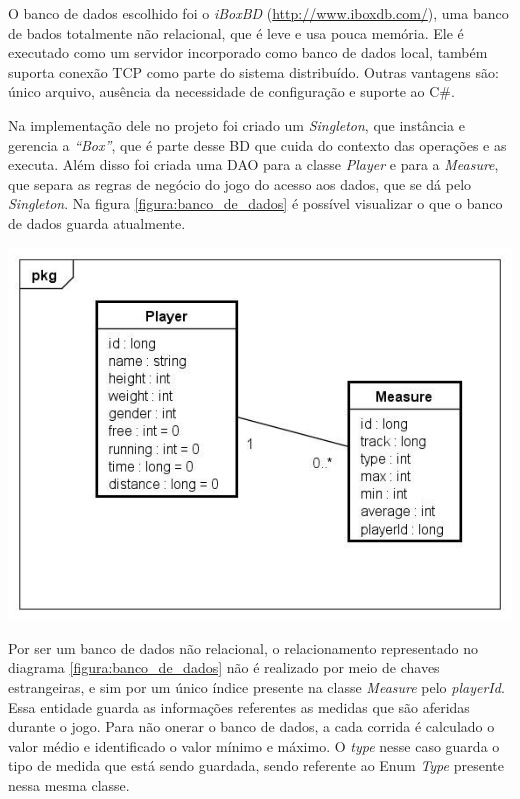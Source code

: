 O banco de dados escolhido foi o \textit{iBoxBD} (\url{http://www.iboxdb.com/}), uma banco de bados totalmente não relacional, que é leve e usa pouca memória. Ele é executado como um servidor incorporado como banco de dados local, também suporta conexão TCP como parte do sistema distribuído. Outras vantagens são: único arquivo, ausência da necessidade de configuração e suporte ao C\#.

Na implementação dele no projeto foi criado um \textit{Singleton}, que instância e gerencia a \textit{“Box”}, que é parte desse BD que cuida do contexto das operações e as executa. Além disso foi criada uma DAO para a classe \textit{Player} e para a \textit{Measure}, que separa as regras de negócio do jogo do acesso aos dados, que se dá pelo \textit{Singleton}. Na figura \ref{figura:banco_de_dados} é possível visualizar o que o banco de dados guarda atualmente.

\begin{center}
	\includegraphics[scale=0.6]{figuras/banco_de_dados}
	\label{figura:banco_de_dados}
\end{center}

Por ser um banco de dados não relacional, o relacionamento representado no diagrama \ref{figura:banco_de_dados} não é realizado por meio de chaves estrangeiras, e sim por um único índice presente na classe \textit{Measure} pelo \textit{playerId}. Essa entidade guarda as informações referentes as medidas que são aferidas durante o jogo. Para não onerar o banco de dados, a cada corrida é calculado o valor médio e identificado o valor mínimo e máximo. O \textit{type} nesse caso guarda o tipo de medida que está sendo guardada, sendo referente ao Enum \textit{Type} presente nessa mesma classe.

